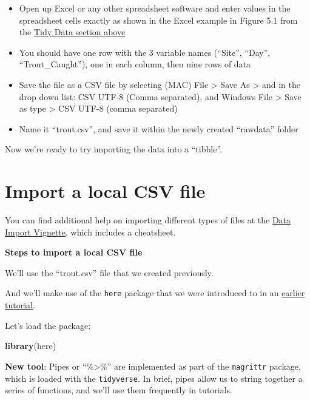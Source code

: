 \documentclass[
]{book}
\newenvironment{Shaded}{\begin{snugshade}}{\end{snugshade}}
\newcommand{\FunctionTok}[1]{\textcolor[rgb]{0.13,0.29,0.53}{\textbf{#1}}}
\newcommand{\NormalTok}[1]{#1}
\providecommand{\tightlist}{%
  \setlength{\itemsep}{0pt}\setlength{\parskip}{0pt}}
\begin{document}
\begin{itemize}
\tightlist
\item
  Open up Excel or any other spreadsheet software and enter values in the spreadsheet cells exactly as shown in the Excel example in Figure 5.1 from the \hyperref[tidy_data]{Tidy Data section above}
\item
  You should have one row with the 3 variable names (``Site'', ``Day'', ``Trout\_Caught''), one in each column, then nine rows of data
\item
  Save the file as a CSV file by selecting (MAC) File \textgreater{} Save As \textgreater{} and in the drop down list: CSV UTF-8 (Comma separated), and Windows File \textgreater{} Save as type \textgreater{} CSV UTF-8 (comma separated)
\item
  Name it ``trout.csv'', and save it within the newly created ``rawdata'' folder
\end{itemize}

Now we're ready to try importing the data into a ``tibble''.

\section{Import a local CSV file}\label{import_csv_local}

You can find additional help on importing different types of files at the \href{https://rstudio.github.io/cheatsheets/html/data-import.html}{Data Import Vignette}, which includes a cheatsheet.

\textbf{Steps to import a local CSV file}

We'll use the ``trout.csv'' file that we created previously.

And we'll make use of the \texttt{here} package that we were introduced to in an \hyperref[here_package]{earlier tutorial}.

Let's load the package:

\begin{Shaded}
\begin{Highlighting}[]
\FunctionTok{library}\NormalTok{(here)}
\end{Highlighting}
\end{Shaded}

\textbf{New tool}: Pipes or ``\%\textgreater\%'' are implemented as part of the \texttt{magrittr} package, which is loaded with the \texttt{tidyverse}. In brief, pipes allow us to string together a series of functions, and we'll use them frequently in tutorials.
\end{document}
